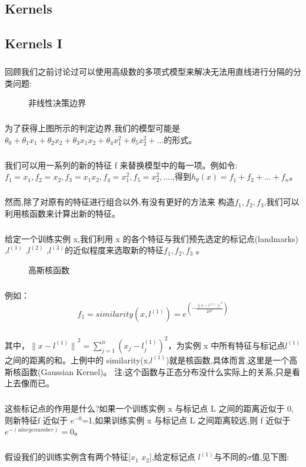 \documentclass{article}
\begin{document}
\begin{CJK}{UTF8}{gbsn}
\section{Kernels}
\subsection{Kernels I}
\subparagraph{}
回顾我们之前讨论过可以使用高级数的多项式模型来解决无法用直线进行分隔的分类问题:
\begin{figure}[H]
\label{fig:730}
\caption{非线性决策边界}
\end{figure}
\subparagraph{}
为了获得上图所示的判定边界,我们的模型可能是$\theta_0+\theta_1x_1+\theta_2x_2+\theta_3x_1x_2+\theta_4x_1^2+\theta_5x_2^2+...$的形式。
\subparagraph{}
我们可以用一系列的新的特征 f 来替换模型中的每一项。例如令:
$f_1=x_1,f_2=x_2,f_3=x_1x_2,f_4=x_1^2,f_5=x_2^2,....$,得到$h_\theta(x)=f_1+f_2+...+f_n$。
\subparagraph{}
然而,除了对原有的特征进行组合以外,有没有更好的方法来
构造$f_1,f_2,f_3$,我们可以利用核函数来计算出新的特征。
\subparagraph{}
给定一个训练实例 x,我们利用 x 的各个特征与我们预先选定的标记点(landmarks) ,$l^{(1)}$ ,$l^{(2)}$ ,$l^{(3)}$的近似程度来选取新的特征$f_1,f_2,f_3$ 。
\begin{figure}[H]
\label{fig:731}
\caption{高斯核函数}
\end{figure}
\subparagraph{}
例如：
\begin{equation}
f_1=similarity(x,l^{(1)})=e^{(-\frac{{\parallel{x-l^{(1)}}\parallel}^2}{2{\sigma}^2})}
\end{equation}
\subparagraph{}
其中，${\parallel{x-l^{(1)}}\parallel}^2=\sum_{j=1}^n(x_j-l_j^{(1)})^2$，为实例 x 中所有特征与标记点$l^{(1)}$之间的距离的和。上例中的 similarity(x,$l^{(1)}$)就是核函数,具体而言,这里是一个高斯核函数(Gaussian Kernel)。 注:这个函数与正态分布没什么实际上的关系,只是看上去像而已。
\subparagraph{}
这些标记点的作用是什么?如果一个训练实例 x 与标记点 L 之间的距离近似于 0,则新特征f 近似于 $e^{-0}$=1,如果训练实例 x 与标记点 L 之间距离较远,则 f 近似于 $e^{-(a large number)}=0$。
\begin{figure}[H]
\label{fig:732}
\end{figure}
\subparagraph{}
假设我们的训练实例含有两个特征[$x_1$ $x_2$],给定标记点 $l^{(1)}$与不同的$\sigma$值,见下图:
\begin{figure}[H]
\label{fig:733}
\end{figure}

\end{CJK}
\end{document}
